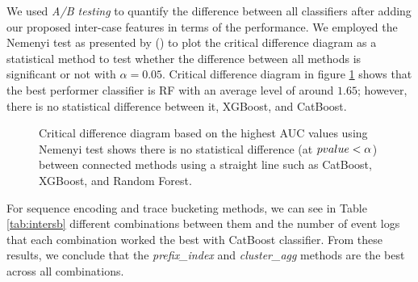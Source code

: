We used \textit{A/B testing} to quantify the difference between all classifiers after adding our proposed inter-case features in terms of the performance. We employed the Nemenyi test as presented by (\cite{demvsar2006statistical}) to plot the critical difference diagram as a statistical method to test whether the difference between all methods is significant or not with $\alpha = 0.05$. Critical difference diagram in figure \ref{fig:intercd} shows that the best performer classifier is RF with an average level of around $1.65$; however, there is no statistical difference between it, XGBoost, and CatBoost.

\begin{figure}[!htb]
	\begin{center}
		\caption[Comparison of all classification algorithms using the Nemenyi test]{Critical difference diagram based on the highest AUC values using Nemenyi test shows there is no statistical difference (at $p\-value < \alpha$) between connected methods using a straight line such as CatBoost, XGBoost, and Random Forest.}
		\label{fig:intercd}
	\end{center}
\end{figure}


For sequence encoding and trace bucketing methods, we can see in Table \ref{tab:intersb} different combinations between them and the number of event logs that each combination worked the best with CatBoost classifier. From these results, we conclude that the \textit{prefix\_index} and \textit{cluster\_agg} methods are the best across all combinations.

